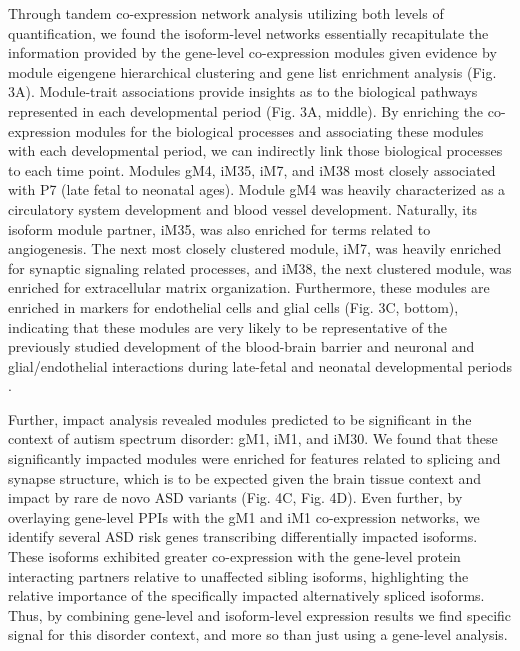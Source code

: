 \documentclass[12pt,chapterheads,final]{ucsd}
\begin{document}
Through tandem co-expression network analysis utilizing both levels of quantification, we found the isoform-level networks essentially recapitulate the information provided by the gene-level co-expression modules given evidence by module eigengene hierarchical clustering and gene list enrichment analysis (Fig. 3A). Module-trait associations provide insights as to the biological pathways represented in each developmental period (Fig. 3A, middle). By enriching the co-expression modules for the biological processes and associating these modules with each developmental period, we can indirectly link those biological processes to each time point. Modules gM4, iM35, iM7, and iM38 most closely associated with P7 (late fetal to neonatal ages). Module gM4 was heavily characterized as a circulatory system development and blood vessel development. Naturally, its isoform module partner, iM35, was also enriched for terms related to angiogenesis. The next most closely clustered module, iM7, was heavily enriched for synaptic signaling related processes, and iM38, the next clustered module, was enriched for extracellular matrix organization. Furthermore, these modules are enriched in markers for endothelial cells and glial cells (Fig. 3C, bottom), indicating that these modules are very likely to be representative of the previously studied development of the blood-brain barrier and neuronal and glial/endothelial interactions during late-fetal and neonatal developmental periods \cite{Gandal2018,Nag2002,Obermeier2013,Saunders2012,Watson2016,Zobel2016}. \par
Further, impact analysis revealed modules predicted to be significant in the context of autism spectrum disorder: gM1, iM1, and iM30. We found that these significantly impacted modules were enriched for features related to splicing and synapse structure, which is to be expected given the brain tissue context and impact by rare de novo ASD variants (Fig. 4C, Fig. 4D). Even further, by overlaying gene-level PPIs with the gM1 and iM1 co-expression networks, we identify several ASD risk genes transcribing differentially impacted isoforms. These isoforms exhibited greater co-expression with the gene-level protein interacting partners relative to unaffected sibling isoforms, highlighting the relative importance of the specifically impacted alternatively spliced isoforms. Thus, by combining gene-level and isoform-level expression results we find specific signal for this disorder context, and more so than just using a gene-level analysis. \par
\end{document}
